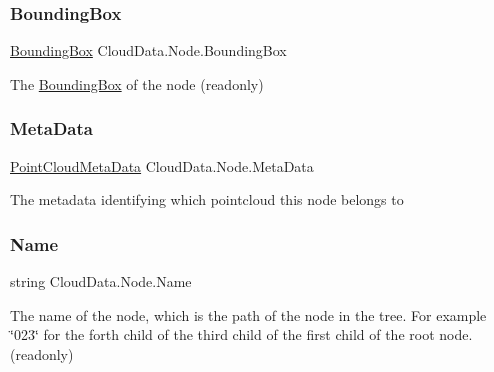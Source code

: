 \subsubsection{\texorpdfstring{Bounding\+Box}{BoundingBox}}
{\footnotesize\ttfamily \hyperlink{class_cloud_data_1_1_bounding_box}{Bounding\+Box} Cloud\+Data.\+Node.\+Bounding\+Box\hspace{0.3cm}{\ttfamily [get]}}



The \hyperlink{class_cloud_data_1_1_bounding_box}{Bounding\+Box} of the node (readonly) 

\mbox{\label{class_cloud_data_1_1_node_acc0afd56fb7f3c0c22fdfda9c43dce0c}} 
\subsubsection{\texorpdfstring{Meta\+Data}{MetaData}}
{\footnotesize\ttfamily \hyperlink{class_cloud_data_1_1_point_cloud_meta_data}{Point\+Cloud\+Meta\+Data} Cloud\+Data.\+Node.\+Meta\+Data\hspace{0.3cm}{\ttfamily [get]}}



The metadata identifying which pointcloud this node belongs to 

\mbox{\label{class_cloud_data_1_1_node_ad6676243e485f19675af4055c164071b}} 
\subsubsection{\texorpdfstring{Name}{Name}}
{\footnotesize\ttfamily string Cloud\+Data.\+Node.\+Name\hspace{0.3cm}{\ttfamily [get]}}



The name of the node, which is the path of the node in the tree. For example \char`\"{}023\char`\"{} for the forth child of the third child of the first child of the root node. (readonly) 

\mbox{\label{class_cloud_data_1_1_node_add6b3b455a1b95a74506a849a1081f28}} 
